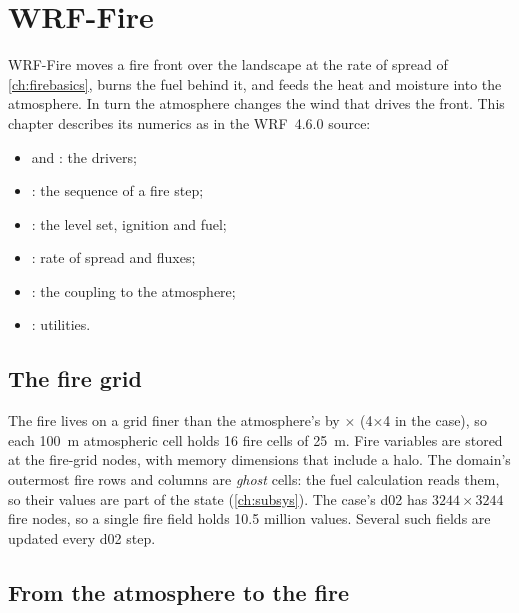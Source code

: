 \chapter{WRF-Fire}\label{ch:fire}

WRF-Fire \citep{coen2013,mandel2011} moves a fire front over the landscape at the rate of spread of
\cref{ch:firebasics}, burns the fuel behind it, and feeds the heat and moisture into the atmosphere. In turn the
atmosphere changes the wind that drives the front. This chapter describes its numerics as in the WRF~4.6.0 source:
\begin{itemize}
  \item {} and : the drivers;
  \item {}: the sequence of a fire step;
  \item {}: the level set, ignition and fuel;
  \item {}: rate of spread and fluxes;
  \item {}: the coupling to the atmosphere;
  \item {}: utilities.
\end{itemize}

\section{The fire grid}

The fire lives on a grid finer than the atmosphere's by $\times$ (4$\times$4 in the case), so
each 100~m atmospheric cell holds 16 fire cells of 25~m. Fire variables are stored at the fire-grid nodes, with
memory dimensions that include a halo. The domain's outermost fire rows and columns are \emph{ghost} cells: the
fuel calculation reads them, so their values are part of the state (\cref{ch:subsys}). The case's d02 has
$3244\times3244$ fire nodes, so a single fire field holds 10.5 million values. Several such fields are updated every
d02 step.

\section{From the atmosphere to the fire}


